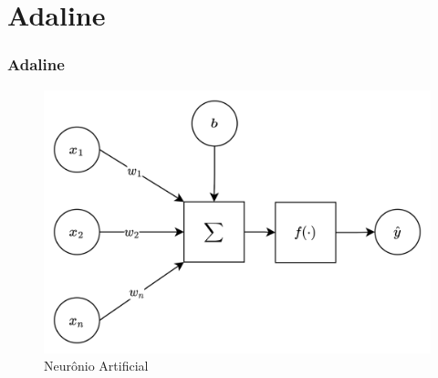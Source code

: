 \documentclass{beamer}
\begin{document}
\section{Adaline}


\begin{frame}
	\frametitle{Adaline}
	\begin{figure}
		\centering
		\includegraphics[width=0.4\linewidth]{figures/neuron_ai}
		\caption{Neurônio Artificial}
		\label{fig:neuronai_ada}
	\end{figure}
\end{frame}
\end{document}
